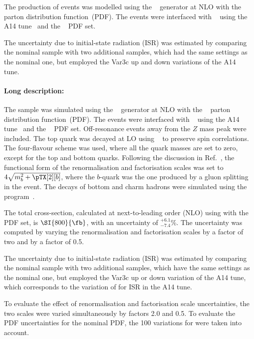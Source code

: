 The production of \tZq events was modelled using the \MGNLO[2.3.3]~\cite{Alwall:2014hca}
generator at NLO with the \NNPDF[3.0nlo]~\cite{Ball:2014uwa} parton distribution function~(PDF).
The events were interfaced with \PYTHIA[8.230]~\cite{Sjostrand:2014zea} using the A14 tune~\cite{ATL-PHYS-PUB-2014-021} and the
\NNPDF[2.3lo]~\cite{Ball:2014uwa} PDF set.

The uncertainty due to initial-state radiation (ISR) was estimated by comparing the nominal \tZq sample with two additional samples,
which had the same settings as the nominal one, but employed the Var3c up and down variations of the A14 tune. 


\paragraph{Long description:}

The \tZq sample was simulated using the \MGNLO[2.3.3]~\cite{Alwall:2014hca}
generator at NLO with the \NNPDF[3.0nlo]~\cite{Ball:2014uwa} parton distribution function~(PDF). The events were interfaced with
\PYTHIA[8.230]~\cite{Sjostrand:2014zea} using the A14 tune~\cite{ATL-PHYS-PUB-2014-021} 
and the \NNPDF[2.3lo]~\cite{Ball:2014uwa} PDF set. Off-resonance events away from the $Z$ mass peak were included. 
The top quark was decayed at LO using \MADSPIN~\cite{Frixione:2007zp,Artoisenet:2012st} to preserve spin correlations.
The four-flavour scheme was used, where all the quark masses are set to zero, except for the top and bottom quarks. 
Following the discussion in Ref.~\cite{Frederix:2012dh}, the functional form of the renormalisation and factorisation scales 
was set to $4\sqrt{m_b^2+\pTX[2][b]}$, where the $b$-quark was the one produced by a gluon splitting in the event. 
The decays of bottom and charm hadrons were simulated using the \EVTGEN program~\cite{Lange:2001uf}.

The \tZq total cross-section, calculated at next-to-leading order (NLO) using \MGNLO[2.3.3] with the \NNPDF[3.0nlo] PDF set, 
is $\SI{800}{\fb}$, with an uncertainty of $^{+6.1}_{-7.4}$\%. The uncertainty was computed by varying the renormalisation and 
factorisation scales by a factor of two and by a factor of 0.5.

The uncertainty due to initial-state radiation (ISR) was estimated by comparing the nominal \tZq sample with two additional samples,
which have the same settings as the nominal one, but employed the Var3c up or down variation of the A14 tune, which
corresponds to the variation of \alphas for ISR in the A14 tune.

To evaluate the effect of renormalisation and factorisation scale uncertainties, the two scales were varied simultaneously by factors 2.0 and 0.5.
To evaluate the PDF uncertainties for the nominal PDF, the 100 variations for \NNPDF[2.3lo] were taken into account. 
